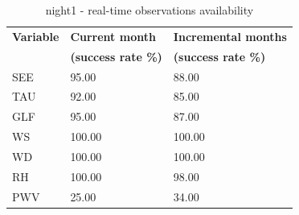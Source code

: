 \begin{table}[]
\begin{center}
\begin{tabular}{|l|l|l|}
\hline
\rowcolor[HTML]{C0C0C0} 
\textbf{Variable} & \textbf{Current month} & \textbf{Incremental months}\\
\rowcolor[HTML]{C0C0C0} 
              & \textbf{(success rate \%)} & \textbf{(success rate \%)}\\
\hline
SEE                & 95.00 & 88.00 \\
TAU                & 92.00 & 85.00 \\
GLF                & 95.00 & 87.00 \\
WS                 & 100.00 & 100.00 \\
WD                 & 100.00 & 100.00 \\
RH                 & 100.00 & 98.00 \\
PWV                & 25.00 & 34.00 \\  
\hline
\end{tabular}
\caption{night1 - real-time observations availability}\label{tab:obs_ava_nig}
\end{center}
\end{table}
